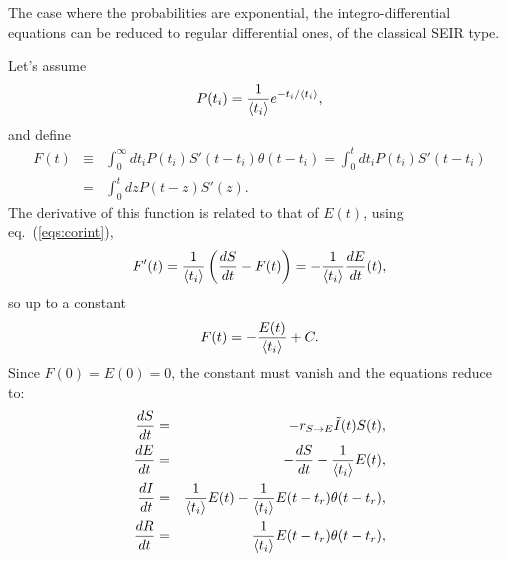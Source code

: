 \documentclass[a4paper,oneside,11pt]{article}
\begin{document}
The case where the probabilities are exponential, the integro-differential equations can be reduced to regular differential ones, of the classical SEIR type.

 Let's assume
\begin{eqnarray}
P(t_i) = {1\over \langle t_i\rangle} e^{-t_i/\langle t_i\rangle},
\end{eqnarray}
and define
\begin{eqnarray}
F(t) &\equiv& \int_0^\infty dt_iP(t_i) S'(t-t_i) \theta(t-t_i) = \int_0^t dt_i P(t_i)  S'(t-t_i) \nonumber\\
&=& \int_0^t dz P(t-z) S'(z).
\end{eqnarray}
The derivative of this function is related to that of $E(t)$, using eq.~(\ref{eqs:corint}),
\begin{eqnarray}
F'(t) = {1\over \langle t_i\rangle} \left({d S\over dt}-F(t)\right) = - {1\over \langle t_i\rangle} {dE\over d t}(t),
\end{eqnarray}
so up to a constant
\begin{eqnarray}
F(t) = -{E(t)\over \langle t_i\rangle} +C.
\end{eqnarray}
Since $F(0) = E(0) =0$, the constant must vanish and the equations reduce to:
\begin{eqnarray}
{d S\over dt} &=& - r_{S\rightarrow E} \tilde{I}(t) S(t),\nonumber\\
{d E\over dt} &=& -{d S\over d t} - {1 \over \langle t_i\rangle} E(t) ,\nonumber\\
{d I\over dt} &=& {1 \over \langle t_i\rangle} E(t) -{1\over \langle t_i\rangle} E(t-t_r) \theta(t-t_r),\nonumber\\
{d R\over d t} &=&  {1\over  \langle t_i\rangle} E(t-t_r) \theta(t-t_r),\nonumber\\
\end{eqnarray}
\end{document}
